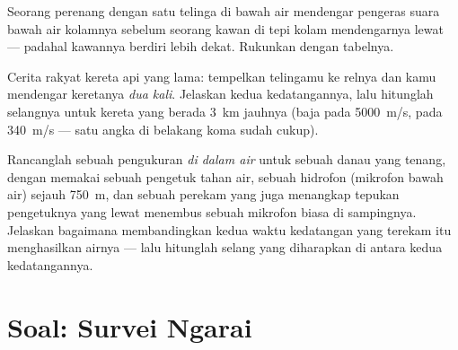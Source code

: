 \begin{exercise}[$\star\star$]\label{exo:g7:sound-production:10}
Seorang perenang dengan satu telinga di bawah air mendengar pengeras
suara bawah air kolamnya sebelum seorang kawan di tepi kolam
mendengarnya lewat  --- padahal kawannya berdiri lebih dekat.
Rukunkan dengan tabelnya.
\end{exercise}

\begin{exercise}[$\star\star$]\label{exo:g7:sound-production:11}
Cerita rakyat kereta api yang lama: tempelkan telingamu ke relnya dan
kamu mendengar keretanya \emph{dua kali}. Jelaskan kedua
kedatangannya, lalu hitunglah selangnya untuk kereta yang berada
\qty{3}{km} jauhnya (baja pada \qty{5000}{m/s},  pada
\qty{340}{m/s} --- satu angka di belakang koma sudah cukup).
\end{exercise}

\begin{exercise}[$\star\star\star$]\label{exo:g7:sound-production:12}
Rancanglah sebuah pengukuran   \emph{di dalam air} untuk
sebuah danau yang tenang, dengan memakai sebuah pengetuk tahan air,
sebuah hidrofon (mikrofon bawah air) sejauh \qty{750}{m}, dan sebuah
perekam yang juga menangkap tepukan pengetuknya yang lewat 
menembus sebuah mikrofon biasa di sampingnya. Jelaskan bagaimana
membandingkan kedua waktu kedatangan yang terekam itu menghasilkan
 airnya --- lalu hitunglah selang yang diharapkan di antara
kedua kedatangannya.
\end{exercise}

\section{Soal: Survei Ngarai}

